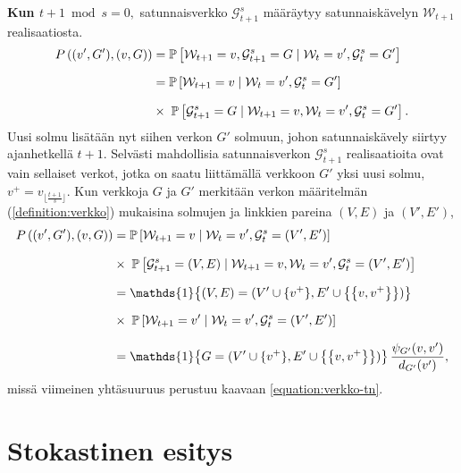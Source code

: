 \documentclass[finnish, 12pt, a4paper, sci, utf8, pdfa]{aaltothesis}
\newcommand{\Grandom}{\mathcal{G}}
\newcommand{\Wrandom}{\mathcal{W}}
\newcommand{\indicator}{\mathopen{\mathds{1}}}
\newcommand*{\prob}{\mathbb{P}}
\begin{document}
{\textbf{Kun $ t + 1 \bmod s = 0, $} satunnaisverkko $ \Grandom^{s}_{t+1} $ määräytyy satunnaiskävelyn $ \Wrandom_{t+1} $ realisaatiosta.
\begin{equation*}
   \setlength{\jot}{10pt}
   \begin{aligned}
   P\left( (v', G'), (v, G) \right) &= \prob \left[ \Wrandom_{t+1} = v, \Grandom^{s}_{t+1} = G \mid \Wrandom_{t} = v', \Grandom^{s}_{t} = G' \right] \\
   &= \prob \left[ \Wrandom_{t+1} = v \mid \Wrandom_{t} = v', \Grandom^{s}_{t} = G' \right] \\
   &\times \; \prob \left[ \Grandom^{s}_{t+1} = G \mid \Wrandom_{t+1} = v, \Wrandom_{t} = v', \Grandom^{s}_{t} = G' \right].
   \end{aligned}
\end{equation*}
Uusi solmu lisätään nyt siihen verkon $ G' $ solmuun, johon satunnaiskävely siirtyy ajanhetkellä $ t + 1 $. Selvästi mahdollisia satunnaisverkon $ \Grandom^{s}_{t+1} $ realisaatioita ovat vain sellaiset verkot, jotka on saatu liittämällä verkkoon $ G' $ yksi uusi solmu, $ v^{+} = v_{\lfloor \frac{t+1}{s} \rfloor} $. Kun verkkoja $ G $ ja $ G' $ merkitään verkon määritelmän (\ref{definition:verkko}) mukaisina solmujen ja linkkien pareina $ (V, E) $ ja $ (V', E') $,
\begin{equation*}
   \setlength{\jot}{10pt}
   \begin{aligned}
   P\left( (v', G'), (v, G) \right) &= \prob \left[ \Wrandom_{t+1} = v \mid \Wrandom_{t} = v', \Grandom^{s}_{t} = (V', E') \right] \\
           &\times \; \prob \left[ \Grandom^{s}_{t+1} = (V, E) \mid \Wrandom_{t+1} = v, \Wrandom_{t} = v', \Grandom^{s}_{t} = (V', E') \right] \\
           &= \indicator \left\{ (V, E) = (V' \cup \{ v^{+} \}, E' \cup \left\{ \left\{ v, v^{+} \right\} \right\}) \right\} \\
           &\times \; \prob \left[ \Wrandom_{t+1} = v' \mid \Wrandom_{t} = v', \Grandom^{s}_{t} = (V', E') \right] \\
           &= \indicator \left\{ G = (V' \cup \{ v^{+} \}, E' \cup \left\{ \left\{ v, v^{+} \right\} \right\}) \right\} \frac{\psi_{G'}(v, v')}{d_{G'}(v')},
   \end{aligned}
\end{equation*}
missä viimeinen yhtäsuuruus perustuu kaavaan \ref{equation:verkko-tn}.
}

\section{Stokastinen esitys}
\end{document}
